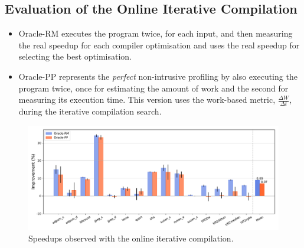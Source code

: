 \documentclass[sigplan,9pt]{acmart}
\newcommand{\itercomp}{{iterative compilation}}
\newcommand{\IterComp}{{Iterative Compilation}}
\begin{document}
\subsection{Evaluation of the Online {\IterComp}}

\begin{itemize}
\item Oracle-RM executes the program twice, for each input, and then measuring the real speedup for each compiler optimisation and uses the real speedup for selecting the best optimisation.
\item Oracle-PP represents the \textit{perfect} non-intrusive profiling by also executing the program twice, once for estimating the amount of work and the second for measuring its execution time.
This version uses the work-based metric, $\frac{\Delta W}{\Delta t}$, during the {\itercomp} search.
\end{itemize}

\begin{figure}[htb]
    \centering
    \includegraphics[width=\textwidth]{figs/speedups.pdf}
    \caption{Speedups observed with the online {\itercomp}.}
    \label{fig:speedups}
\end{figure}


%
%
\end{document}
